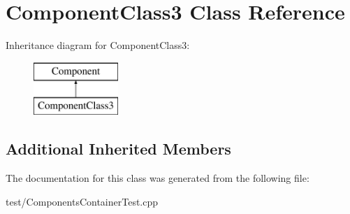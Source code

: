 \hypertarget{classComponentClass3}{}\section{Component\+Class3 Class Reference}
\label{classComponentClass3}
Inheritance diagram for Component\+Class3\+:\begin{figure}[H]
\begin{center}
\leavevmode
\includegraphics[height=2.000000cm]{classComponentClass3}
\end{center}
\end{figure}
\subsection*{Additional Inherited Members}


The documentation for this class was generated from the following file\+:\begin{DoxyCompactItemize}
\item 
test/Components\+Container\+Test.\+cpp\end{DoxyCompactItemize}

